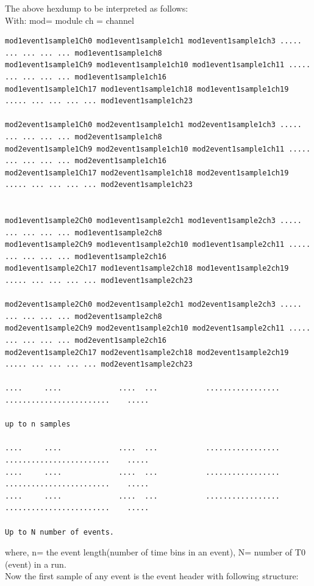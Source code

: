 \documentclass[12pt]{article}
\begin{document}
The above hexdump to be interpreted as follows:\\
With: mod= module  ch = channel\\
\begingroup
    \fontsize{8pt}{12pt}\selectfont
    \begin{verbatim}      
mod1event1sample1Ch0 mod1event1sample1ch1 mod1event1sample1ch3 ..... ... ... ... ... mod1event1sample1ch8 
mod1event1sample1Ch9 mod1event1sample1ch10 mod1event1sample1ch11 ..... ... ... ... ... mod1event1sample1ch16
mod1event1sample1Ch17 mod1event1sample1ch18 mod1event1sample1ch19 ..... ... ... ... ... mod1event1sample1ch23

mod2event1sample1Ch0 mod2event1sample1ch1 mod2event1sample1ch3 ..... ... ... ... ... mod2event1sample1ch8 
mod2event1sample1Ch9 mod2event1sample1ch10 mod2event1sample1ch11 ..... ... ... ... ... mod2event1sample1ch16
mod2event1sample1Ch17 mod2event1sample1ch18 mod2event1sample1ch19 ..... ... ... ... ... mod2event1sample1ch23


mod1event1sample2Ch0 mod1event1sample2ch1 mod1event1sample2ch3 ..... ... ... ... ... mod1event1sample2ch8 
mod1event1sample2Ch9 mod1event1sample2ch10 mod1event1sample2ch11 ..... ... ... ... ... mod1event1sample2ch16
mod1event1sample2Ch17 mod1event1sample2ch18 mod1event1sample2ch19 ..... ... ... ... ... mod1event1sample2ch23

mod2event1sample2Ch0 mod2event1sample2ch1 mod2event1sample2ch3 ..... ... ... ... ... mod2event1sample2ch8
mod2event1sample2Ch9 mod2event1sample2ch10 mod2event1sample2ch11 ..... ... ... ... ... mod2event1sample2ch16
mod2event1sample2Ch17 mod2event1sample2ch18 mod2event1sample2ch19 ..... ... ... ... ... mod2event1sample2ch23
  
....     ....             ....  ...           .................             ........................    .....

up to n samples

....     ....             ....  ...           .................             ........................    .....
....     ....             ....  ...           .................             ........................    .....
....     ....             ....  ...           .................             ........................    .....

Up to N number of events.
\end{verbatim}    
\endgroup
where, n= the event length(number of time bins in an event), N= number of T0 (event) in a run. \\
Now the first sample of any event is the event header with following structure:\\
\end{document}
